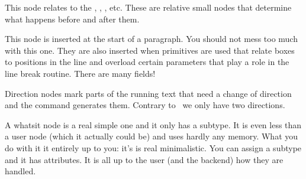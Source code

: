 
\stopsubsection

\startsubsection[title={boundary}]

This node relates to the \type {\noboundary}, \type {\boundary}, \type
{\protrusionboundary}, \type {\wordboundary} etc. These are relative small nodes
that determine what happens before and after them.



\stopsubsection

\startsubsection[title={par}]

This node is inserted at the start of a paragraph. You should not mess too much
with this one. They are also inserted when  primitives are used
that relate boxes to positions in the line and overload certain parameters that
play a role in the line break routine. There are many fields!



\stopsubsection

\startsubsection[title={dir}]

Direction nodes mark parts of the running text that need a change of direction
and the \type {\textdirection} command generates them. Contrary to \LUATEX\
we only have two directions.



\stopsubsection

\startsubsection[title={whatsit}]

A whatsit node is a real simple one and it only has a subtype. It is even less
than a user node (which it actually could be) and uses hardly any memory. What
you do with it it entirely up to you: it's is real minimalistic. You can assign a
subtype and it has attributes. It is all up to the user (and the backend) how
they are handled.



\stopsubsection

\startsubsection[title={attribute}]

